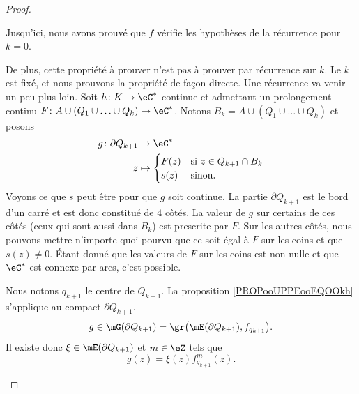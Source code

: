 \begin{proof}
\begin{subproof}

		Jusqu'ici, nous avons prouvé que \( f\) vérifie les hypothèses de la récurrence pour \( k=0\).

		De plus, cette propriété à prouver n'est pas à prouver par récurrence sur \( k\). Le \( k\) est fixé, et nous prouvons la propriété de façon directe.  Une récurrence va venir un peu plus loin.
		Soit \( h\colon K\to \eC^*\) continue et admettant un prolongement continu \( F\colon A\cup(Q_1\cup\ldots\cup Q_k)\to \eC^*\). Notons \( B_k=A\cup(Q_1\cup\ldots\cup Q_k)\) et posons
		\begin{equation}
			\begin{aligned}
				g\colon \partial Q_{k+1} & \to \eC^*                                      \\
				z                        & \mapsto \begin{cases}
					                                   F(z) & \text{si } z\in Q_{k+1}\cap B_k \\
					                                   s(z) & \text{sinon. }
				                                   \end{cases}
			\end{aligned}
		\end{equation}
		Voyons ce que \( s\) peut être pour que \( g\) soit continue. La partie \( \partial Q_{k+1}\) est le bord d'un carré et est donc constitué de \( 4\) côtés. La valeur de \( g\) sur certains de ces côtés (ceux qui sont aussi dans \( B_k\)) est prescrite par \( F\). Sur les autres côtés, nous pouvons mettre n'importe quoi pourvu que ce soit égal à \( F\) sur les coins et que \( s(z)\neq 0\). Étant donné que les valeurs de \( F\) sur les coins est non nulle et que \( \eC^*\) est connexe par arcs, c'est possible.

		Nous notons \( q_{k+1}\) le centre de \( Q_{k+1}\). La proposition \ref{PROPooUPPEooEQOOkh} s'applique au compact \( \partial Q_{k+1}\).
		\begin{equation}
			g\in\mG(\partial Q_{k+1})=\gr\big( \mE(\partial Q_{k+1}), f_{q_{k+1}}  \big).
		\end{equation}
		Il existe donc \( \xi\in\mE(\partial Q_{k+1})\) et \( m\in \eZ\) tels que
		\begin{equation}
			g(z)=\xi(z)f_{q_{k+1}}^{m}(z).
		\end{equation}


\end{subproof}
\end{proof}
